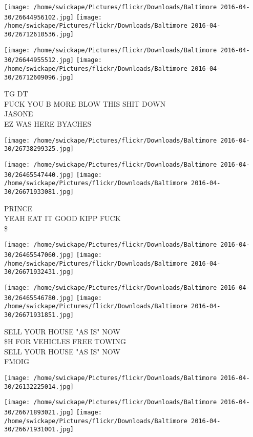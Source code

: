 \documentclass[10pt,letterpaper]{article}
\begin{document}
\texttt{[image: /home/swickape/Pictures/flickr/Downloads/Baltimore 2016-04-30/26644956102.jpg]}
\texttt{[image: /home/swickape/Pictures/flickr/Downloads/Baltimore 2016-04-30/26712610536.jpg]}

\texttt{[image: /home/swickape/Pictures/flickr/Downloads/Baltimore 2016-04-30/26644955512.jpg]}
\texttt{[image: /home/swickape/Pictures/flickr/Downloads/Baltimore 2016-04-30/26712609096.jpg]}

TG DT\\
FUCK YOU B MORE BLOW THIS SHIT DOWN\\
JASONE\\
EZ WAS HERE BYACHES
\pagebreak

\texttt{[image: /home/swickape/Pictures/flickr/Downloads/Baltimore 2016-04-30/26738299325.jpg]}

\vspace{0.25in}
\texttt{[image: /home/swickape/Pictures/flickr/Downloads/Baltimore 2016-04-30/26465547440.jpg]}
\texttt{[image: /home/swickape/Pictures/flickr/Downloads/Baltimore 2016-04-30/26671933081.jpg]}

PRINCE\\
YEAH EAT IT GOOD KIPP FUCK\\
\$
\pagebreak

\texttt{[image: /home/swickape/Pictures/flickr/Downloads/Baltimore 2016-04-30/26465547060.jpg]}
\texttt{[image: /home/swickape/Pictures/flickr/Downloads/Baltimore 2016-04-30/26671932431.jpg]}

\texttt{[image: /home/swickape/Pictures/flickr/Downloads/Baltimore 2016-04-30/26465546780.jpg]}
\texttt{[image: /home/swickape/Pictures/flickr/Downloads/Baltimore 2016-04-30/26671931851.jpg]}

SELL YOUR HOUSE "AS IS" NOW\\
\$H FOR VEHICLES FREE TOWING\\
SELL YOUR HOUSE "AS IS" NOW\\
FMOIG
\pagebreak

\texttt{[image: /home/swickape/Pictures/flickr/Downloads/Baltimore 2016-04-30/26132225014.jpg]}

\vspace{0.25in}
\texttt{[image: /home/swickape/Pictures/flickr/Downloads/Baltimore 2016-04-30/26671893021.jpg]}
\texttt{[image: /home/swickape/Pictures/flickr/Downloads/Baltimore 2016-04-30/26671931001.jpg]}
\end{document}
